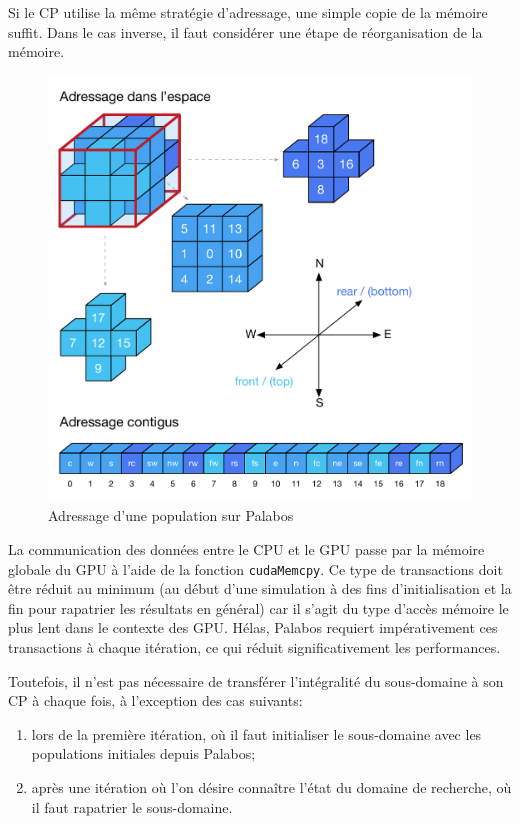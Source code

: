 Si le \ac{CP} utilise la même stratégie d'adressage, une simple copie de la mémoire suffit. Dans le cas inverse, il faut considérer une étape de réorganisation de la mémoire.

\begin{figure}[h]
	\centering
	\includegraphics[scale=0.85, fbox]{images/index_population_palabos.pdf}
	\caption{Adressage d'une population sur Palabos}
	\label{fig:plb_population_index}
\end{figure}

La communication des données entre le \acs{CPU} et le \acs{GPU} passe par la mémoire globale du \acs{GPU} à l'aide de la fonction \texttt{cudaMemcpy}. Ce type de transactions doit être réduit au minimum (au début d'une simulation à des fins d'initialisation et la fin pour rapatrier les résultats en général) car il s'agit du type d'accès mémoire le plus lent dans le contexte des \acs{GPU}. Hélas, Palabos requiert impérativement ces transactions à chaque itération, ce qui réduit significativement les performances.

Toutefois, il n'est pas nécessaire de transférer l'intégralité du sous-domaine à son \ac{CP} à chaque fois, à l'exception des cas suivants:
\begin{enumerate}
\item lors de la première itération, où il faut initialiser le sous-domaine avec les populations initiales depuis Palabos;
\item après une itération où l'on désire connaître l'état du domaine de recherche, où il faut rapatrier le sous-domaine.
\end{enumerate}

